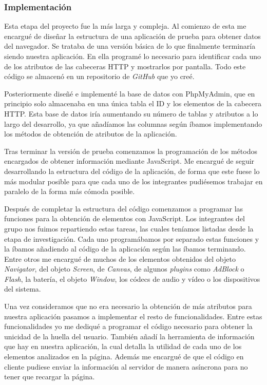 \subsubsection{Implementación}
Esta etapa del proyecto fue la más larga y compleja. Al comienzo de esta me encargué de diseñar la estructura de una aplicación de prueba para obtener datos del navegador. Se trataba de una versión básica de lo que finalmente terminaría siendo nuestra aplicación. En ella programé lo necesario para identificar cada uno de los atributos de las cabeceras HTTP y mostrarlos por pantalla. Todo este código se almacenó en un repositorio de \textit{GitHub} que yo creé.\par
Posteriormente diseñé e implementé la base de datos con PhpMyAdmin, que en principio solo almacenaba en una única tabla el ID y los elementos de la cabecera HTTP. Esta base de datos iría aumentando su número de tablas y atributos a lo largo del desarrollo, ya que añadíamos las columnas según íbamos implementando los métodos de obtención de atributos de la aplicación.\par
Tras terminar la versión de prueba comenzamos la programación de los métodos encargados de obtener información mediante JavaScript. Me encargué de seguir desarrollando la estructura del código de la aplicación, de forma que este fuese lo más modular posible para que cada uno de los integrantes pudiésemos trabajar en paralelo de la forma más cómoda posible.\par
Después de completar la estructura del código comenzamos a programar las funciones para la obtención de elementos con JavaScript. Los integrantes del grupo nos fuimos repartiendo estas tareas, las cuales teníamos listadas desde la etapa de investigación. Cada uno programábamos por separado estas funciones y la íbamos añadiendo al código de la aplicación según las íbamos terminando. Entre otros me encargué de muchos de los elementos obtenidos del objeto \textit{Navigator}, del objeto \textit{Screen}, de \textit{Canvas}, de algunos \emph{plugins} como \textit{AdBlock} o \textit{Flash}, la batería, el objeto \textit{Window}, los códecs de audio y vídeo o los dispositivos del sistema.\par
Una vez consideramos que no era necesario la obtención de más atributos para nuestra aplicación pasamos a implementar el resto de funcionalidades. Entre estas funcionalidades yo me dediqué a programar el código necesario para obtener la unicidad de la huella del usuario. También añadí la herramienta de información que hay en nuestra aplicación, la cual detalla la utilidad de cada uno de los elementos analizados en la página. Además me encargué de que el código en cliente pudiese enviar la información al servidor de manera asíncrona para no tener que recargar la página.\par 
